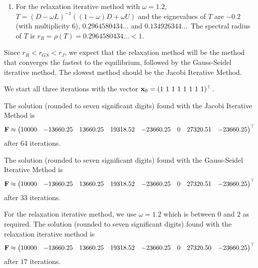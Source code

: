 {\begin{enumerate}
  eigenvalues of $T$ are $0$ (with multiplicity 7) and
  $0.5773502691\ldots$\  Hence, the spectral radius of $T$ is 
  $r_{GS} = \rho(T) = 0.5773502691\ldots < 1$.
\item For the relaxation iterative method with $\omega=1.2$,
  $T = (D-\omega L)^{-1} ((1-\omega)D+\omega U)$ and the eignevalues
  of $T$ are $-0.2$ (with multiplicity 6), $0.2964580434\ldots$ and
  $0.134926344\ldots$\  The spectral radius of $T$ is 
  $r_R = \rho(T) = 0.2964580434\ldots < 1$.
\end{enumerate}
Since $r_R < r_{GS} < r_J$, we expect that the relaxation method will
be the method that converges the fastest to the equilibrium, followed
by the Gauss-Seidel iterative method.  The slowest method should be
the Jacobi Iterative Method.

We start all three iterations with the vector
$\VEC{x}_0 = (1 \ 1 \ 1 \ 1 \ 1 \ 1 \ 1 \ 1)^\top$.

 The solution (rounded to seven significant digits) found with
the Jacobi Iterative Method is
\[
\mathbf{F} \approx \begin{pmatrix}
10000 & -13660.25 & 13660.25 & 19318.52 &  -23660.25 & 0 &
27320.51 & -23660.25 \end{pmatrix}^\top
\]
after $64$ iterations.

 The solution (rounded to seven significant digits) found with
the Gauss-Seidel Iterative Method is
\[
\mathbf{F} \approx \begin{pmatrix}
10000 & -13660.25 & 13660.25 & 19318.52 & -23660.25 & 0 &
27320.51 & -23660.25
\end{pmatrix}^\top
\]
after $33$ iterations.

 For the relaxation iterative method, we use $\omega = 1.2$
which is between $0$ and $2$ as required.  The solution (rounded to
seven significant digits) found with the relaxation iterative method
is
\[
\mathbf{F} \approx \begin{pmatrix}
10000 & -13660.25 & 13660.25 & 19318.52 & -23660.25 & 0 &
27320.50 & -23660.25
\end{pmatrix}^\top
\]
after $17$ iterations.
}

